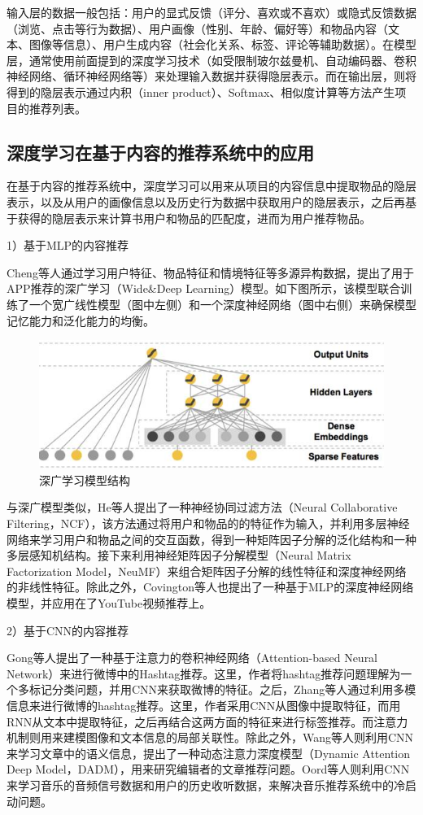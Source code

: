 输入层的数据一般包括：用户的显式反馈（评分、喜欢或不喜欢）或隐式反馈数据（浏览、点击等行为数据）、用户画像（性别、年龄、偏好等）和物品内容（文本、图像等信息）、用户生成内容（社会化关系、标签、评论等辅助数据）。在模型层，通常使用前面提到的深度学习技术（如受限制玻尔兹曼机、自动编码器、卷积神经网络、循环神经网络等）来处理输入数据并获得隐层表示。而在输出层，则将得到的隐层表示通过内积（inner product）、Softmax、相似度计算等方法产生项目的推荐列表。

\subsection{深度学习在基于内容的推荐系统中的应用}
在基于内容的推荐系统中，深度学习可以用来从项目的内容信息中提取物品的隐层表示，以及从用户的画像信息以及历史行为数据中获取用户的隐层表示，之后再基于获得的隐层表示来计算书用户和物品的匹配度，进而为用户推荐物品。

1）基于MLP的内容推荐

Cheng等人\cite{ChengKHSCAACCIA16Wide&Deep}通过学习用户特征、物品特征和情境特征等多源异构数据，提出了用于APP推荐的深广学习（Wide\&Deep Learning）模型。如下图所示，该模型联合训练了一个宽广线性模型（图中左侧）和一个深度神经网络（图中右侧）来确保模型记忆能力和泛化能力的均衡。

\begin{figure}[htbp]
\centering
\includegraphics[width=0.5\linewidth]{images/WideDeep.png}
\caption{深广学习模型结构}
\label{fig:fig1}
\end{figure}

与深广模型类似，He等人\cite{abs-1708-05031NCF}提出了一种神经协同过滤方法（Neural Collaborative Filtering，NCF），该方法通过将用户和物品的的特征作为输入，并利用多层神经网络来学习用户和物品之间的交互函数，得到一种矩阵因子分解的泛化结构和一种多层感知机结构。接下来利用神经矩阵因子分解模型（Neural Matrix Factorization Model，NeuMF）来组合矩阵因子分解的线性特征和深度神经网络的非线性特征。除此之外，Covington等人\cite{CovingtonAS16YouTube}也提出了一种基于MLP的深度神经网络模型，并应用在了YouTube视频推荐上。

2）基于CNN的内容推荐

Gong等人\cite{GongZ16HashtagAttention}提出了一种基于注意力的卷积神经网络（Attention-based Neural Network）来进行微博中的Hashtag推荐。这里，作者将hashtag推荐问题理解为一个多标记分类问题，并用CNN来获取微博的特征。之后，Zhang等人\cite{ZhangWHHG17HashtagMulti}通过利用多模信息来进行微博的hashtag推荐。这里，作者采用CNN从图像中提取特征，而用RNN从文本中提取特征，之后再结合这两方面的特征来进行标签推荐。而注意力机制则用来建模图像和文本信息的局部关联性。除此之外，Wang等人\cite{WangYRTZYW17ArticleRec}则利用CNN来学习文章中的语义信息，提出了一种动态注意力深度模型（Dynamic Attention Deep Model，DADM），用来研究编辑者的文章推荐问题。Oord等人\cite{OordDS13MusicRec}则利用CNN来学习音乐的音频信号数据和用户的历史收听数据，来解决音乐推荐系统中的冷启动问题。

